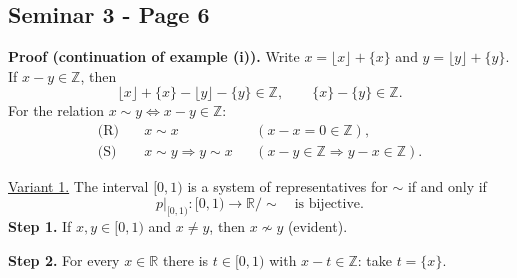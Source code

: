 
\subsection*{Seminar 3 - Page 6}
\begingroup
\setlength{\abovedisplayskip}{5pt}
\setlength{\belowdisplayskip}{5pt}
\setlength{\abovedisplayshortskip}{3pt}
\setlength{\belowdisplayshortskip}{3pt}

\noindent\textbf{Proof (continuation of example (i)).}
Write $x=\lfloor x\rfloor+\{x\}$ and $y=\lfloor y\rfloor+\{y\}$.
If $x-y\in\mathbb Z$, then
\[
 \lfloor x\rfloor+\{x\}-\lfloor y\rfloor-\{y\}\in\mathbb Z,
 \qquad \{x\}-\{y\}\in\mathbb Z.
\]
For the relation $x\sim y\iff x-y\in\mathbb Z$:
\[
 \begin{aligned}
 \text{(R)}\quad &x\sim x &&(x-x=0\in\mathbb Z),\\
 \text{(S)}\quad &x\sim y\Longrightarrow y\sim x
     &&(x-y\in\mathbb Z\Longrightarrow y-x\in\mathbb Z).
 \end{aligned}
\]

\noindent\underline{Variant 1.} The interval $[0,1)$ is a system of
representatives for $\sim$ if and only if
\[
 p|_{[0,1)}:[0,1)\longrightarrow\mathbb R/{\sim}
 \quad\text{is bijective}.
\]
\noindent\textbf{Step 1.} If $x,y\in[0,1)$ and $x\ne y$, then
$x\not\sim y$ (evident).

\noindent\textbf{Step 2.} For every $x\in\mathbb R$ there is
$t\in[0,1)$ with $x-t\in\mathbb Z$: take $t=\{x\}$.

